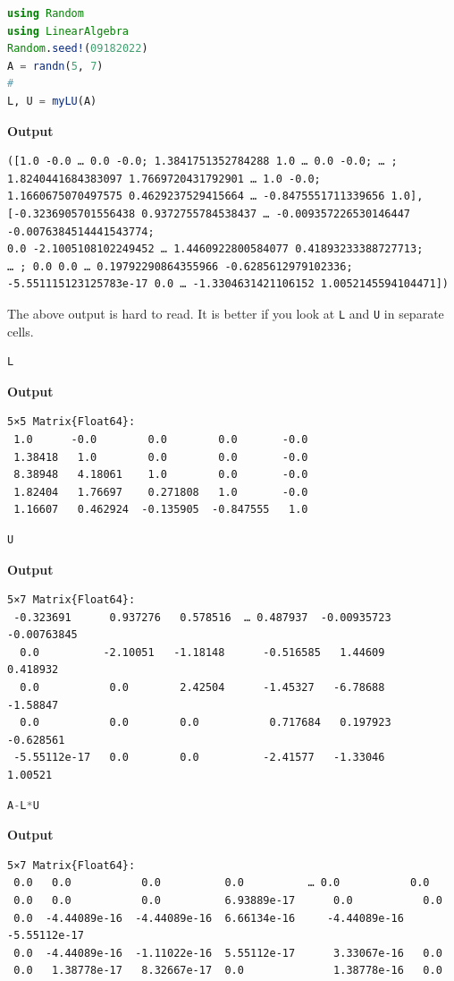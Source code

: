 \begin{lstlisting}[language=Julia,style=mystyle]
using Random
using LinearAlgebra
Random.seed!(09182022)
A = randn(5, 7)
#
L, U = myLU(A)
\end{lstlisting}
\textbf{Output} 
\begin{verbatim}
([1.0 -0.0 … 0.0 -0.0; 1.3841751352784288 1.0 … 0.0 -0.0; … ; 
1.8240441684383097 1.7669720431792901 … 1.0 -0.0; 
1.1660675070497575 0.4629237529415664 … -0.8475551711339656 1.0], 
[-0.3236905701556438 0.9372755784538437 … -0.009357226530146447 -0.0076384514441543774;
0.0 -2.1005108102249452 … 1.4460922800584077 0.41893233388727713;
… ; 0.0 0.0 … 0.19792290864355966 -0.6285612979102336;
-5.551115123125783e-17 0.0 … -1.3304631421106152 1.0052145594104471])
\end{verbatim}

The above output is hard to read. It is better if you look at \texttt{L} and \texttt{U} in separate cells.

\begin{lstlisting}[language=Julia,style=mystyle]
L
\end{lstlisting}
\textbf{Output} 
\begin{verbatim}
5×5 Matrix{Float64}:
 1.0      -0.0        0.0        0.0       -0.0
 1.38418   1.0        0.0        0.0       -0.0
 8.38948   4.18061    1.0        0.0       -0.0
 1.82404   1.76697    0.271808   1.0       -0.0
 1.16607   0.462924  -0.135905  -0.847555   1.0
\end{verbatim}


\begin{lstlisting}[language=Julia,style=mystyle]
U
\end{lstlisting}
\textbf{Output} 
\begin{verbatim}
5×7 Matrix{Float64}:
 -0.323691      0.937276   0.578516  … 0.487937  -0.00935723  -0.00763845
  0.0          -2.10051   -1.18148      -0.516585   1.44609      0.418932
  0.0           0.0        2.42504      -1.45327   -6.78688     -1.58847
  0.0           0.0        0.0           0.717684   0.197923    -0.628561
 -5.55112e-17   0.0        0.0          -2.41577   -1.33046      1.00521
\end{verbatim}

\begin{lstlisting}[language=Julia,style=mystyle]
A-L*U
\end{lstlisting}
\textbf{Output} 
\begin{verbatim}
5×7 Matrix{Float64}:
 0.0   0.0           0.0          0.0          … 0.0           0.0
 0.0   0.0           0.0          6.93889e-17      0.0           0.0
 0.0  -4.44089e-16  -4.44089e-16  6.66134e-16     -4.44089e-16  -5.55112e-17
 0.0  -4.44089e-16  -1.11022e-16  5.55112e-17      3.33067e-16   0.0
 0.0   1.38778e-17   8.32667e-17  0.0              1.38778e-16   0.0
\end{verbatim}

